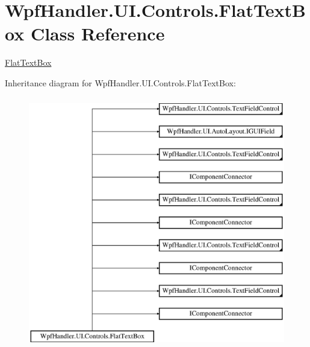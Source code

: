 \hypertarget{class_wpf_handler_1_1_u_i_1_1_controls_1_1_flat_text_box}{}\section{Wpf\+Handler.\+U\+I.\+Controls.\+Flat\+Text\+Box Class Reference}
\label{class_wpf_handler_1_1_u_i_1_1_controls_1_1_flat_text_box}


\mbox{\hyperlink{class_wpf_handler_1_1_u_i_1_1_controls_1_1_flat_text_box}{Flat\+Text\+Box}}  


Inheritance diagram for Wpf\+Handler.\+U\+I.\+Controls.\+Flat\+Text\+Box\+:\begin{figure}[H]
\begin{center}
\leavevmode
\includegraphics[height=11.000000cm]{d3/d32/class_wpf_handler_1_1_u_i_1_1_controls_1_1_flat_text_box}
\end{center}
\end{figure}
